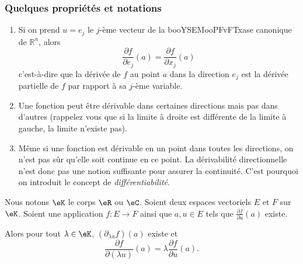 \subsubsection{Quelques propriétés et notations}

\begin{enumerate}
	\item Si on prend \( u=e_j\) le \( j\)-ème vecteur de la booYSEMooPFvFTxase canonique de
	      \( \mathbb{R}^n\), alors
	      \begin{equation}
		      \frac{\partial f}{\partial e_j}(a) = \frac{\partial f}{\partial
			      x_j}(a)
	      \end{equation}
	      c'est-à-dire que la dérivée de \( f\) au point \( a\) dans la
	      direction \( e_j\) est la dérivée partielle de \( f\) par rapport à sa
	      \( j\)-ème variable.

	\item
	      Une fonction peut être dérivable dans certaines directions
	      mais pas dans d'autres (rappelez vous que si la limite à droite est
	      différente de la limite à gauche, la limite n'existe pas).

	\item
	      Même si une fonction est dérivable en un point dans toutes les
	      directions, on n'est pas sûr qu'elle soit continue en ce point. La
	      dérivabilité directionnelle n'est donc pas une notion suffisante
	      pour assurer la continuité. C'est pourquoi on introduit le concept
	      de \emph{différentiabilité}.
\end{enumerate}

\begin{lemma}       \label{LEMooVOTHooPJcrWH}
	Nous notons \( \eK\) le corps \( \eR\) ou \( \eC\). Soient deux espaces vectoriels \( E\) et \( F\) sur \( \eK\). Soient une application \( f\colon E\to F\) ainsi que \( a,u\in E\) tels que \( \frac{ \partial f }{ \partial u }(a)\) existe.

	Alors pour tout \( \lambda\in \eK\), \( (\partial_{\lambda u}f)(a)\) existe et
	\begin{equation}
		\frac{ \partial f }{ \partial (\lambda u) }(a)=\lambda\frac{ \partial f }{ \partial u }(a).
	\end{equation}
\end{lemma}

